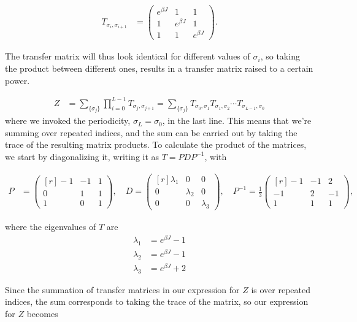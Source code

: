 \documentclass[reprint,english,notitlepage,aps,nobalancelastpage,nofootinbib]{revtex4-1}
\newcommand{\sumstate}{\sum_{\{\sigma_j\}}}
\newcommand{\prodstate}{\prod_{i=0}^{L-1}}
\newcommand{\ebj}{e^{\beta J}}
\newcommand{\T}[1]{T_{\sigma_{#1},\sigma_{#1 + 1}}}
\begin{document}
\begin{align} \label{eq:transfer_matrix}
	T_{\sigma_i,\sigma_{i+1}} &= 
	\begin{pmatrix}
		e^{\beta J} & 1 & 1 \\
		1 & \ebj & 1 \\
		1 & 1 & \ebj
	\end{pmatrix}.
\end{align}

The transfer matrix will thus look identical for different values of $\sigma_i$, so taking the product between different ones, results in a transfer matrix raised to a certain power.  

\begin{align*}
	Z &= \sumstate \prodstate \T{j} = \sumstate T_{\sigma_0,\sigma_1} T_{\sigma_1,\sigma_2}\cdots T_{\sigma_{L-1},\sigma_0} 
\end{align*}
where we invoked the periodicity, $\sigma_L=\sigma_0$, in the last line. This means that we're summing over repeated indices, and the sum can be carried out by taking the trace of the resulting matrix products. To calculate the product of the matrices, we start by diagonalizing it, writing it as $T=PDP^{-1}$, with

\begin{align*}
	P &= 
	\begin{pmatrix*}[r]
		-1 & -1 & 1 \\ 
		0  & 1  & 1 \\ 
		1  & 0  & 1 
	\end{pmatrix*} ,\quad D = \begin{pmatrix*}[r]
		\lambda_1 & 0 & 0 \\ 
		0 & \lambda_2 & 0 \\
		0 & 0 & \lambda_3 
	\end{pmatrix*},\quad
	P^{-1} = \frac{1}{3} \begin{pmatrix*}[r]
		-1 & -1 & 2 \\ 
		-1 & 2  & -1 \\ 
		1  & 1  & 1
	\end{pmatrix*},
\end{align*}

where the eigenvalues of $T$ are 
\begin{align*}
	\lambda_1 &= \ebj-1 \\ 
	\lambda_2 &= \ebj-1 \\ 
	\lambda_3 &= \ebj+2
\end{align*}

Since the summation of transfer matrices in our expression for $Z$ is over repeated indices, the sum corresponds to taking the trace of the matrix, so our expression for $Z$ becomes 
\end{document}
